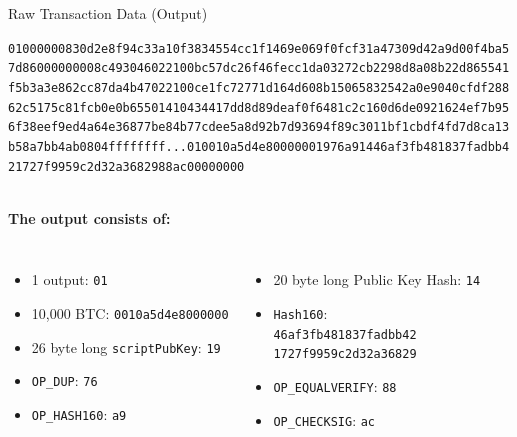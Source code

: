 \documentclass[]{beamer}
\begin{document}
\begin{frame}{Raw Transaction Data (Output)}
\begin{scriptsize}
\texttt{\textcolor{black!30}{01000000830d2e8f94c33a10f3834554cc1f1469e069f0fcf31a47309d42a9d00f4ba5
7d86000000008c493046022100bc57dc26f46fecc1da03272cb2298d8a08b22d865541
f5b3a3e862cc87da4b47022100ce1fc72771d164d608b15065832542a0e9040cfdf288
62c5175c81fcb0e0b65501410434417dd8d89deaf0f6481c2c160d6de0921624ef7b95
6f38eef9ed4a64e36877be84b77cdee5a8d92b7d93694f89c3011bf1cbdf4fd7d8ca13
b58a7bb4ab0804ffffffff}\alert<1>{...}{\alert<2>{01}\alert<3>{0010a5d4e8000000}\alert<4>{19}\alert<5>{76}\alert<6>{a9}\alert<7>{14}\alert<8>{46af3fb481837fadbb4
21727f9959c2d32a36829}\alert<9>{88}\alert<10>{ac}}\textcolor{black!30}{00000000}}
\end{scriptsize}
\vspace{1em}
	\scriptsize \\
	\textbf{The output consists of:}\\
	\begin{columns}
	\begin{itemize}
		\item \alert<2>{1 output: \texttt{01}}
		\item \alert<3>{10,000 BTC: \texttt{0010a5d4e8000000}}
		\item \alert<4>{26 byte long \texttt{scriptPubKey}: \texttt{19}}
		\item \textcolor{black!50}{\alert<5>{\texttt{OP\_DUP}: \texttt{76}}}
		\item \textcolor{black!50}{\alert<6>{\texttt{OP\_HASH160}: \texttt{a9}}}
	\end{itemize}
	\begin{itemize}
		\item \alert<7>{20 byte long Public Key Hash: \texttt{14}}
		\item \alert<8>{\texttt{Hash160}:\\
		\texttt{46af3fb481837fadbb42\\1727f9959c2d32a36829}}
		\item \textcolor{black!50}{\alert<9>{\texttt{OP\_EQUALVERIFY}: \texttt{88}}}
		\item \textcolor{black!50}{\alert<10>{\texttt{OP\_CHECKSIG}: \texttt{ac}}}
	\end{itemize}
	\end{columns}
	\vspace{1em}
	\normalsize
	\\
\end{frame}
\end{document}
